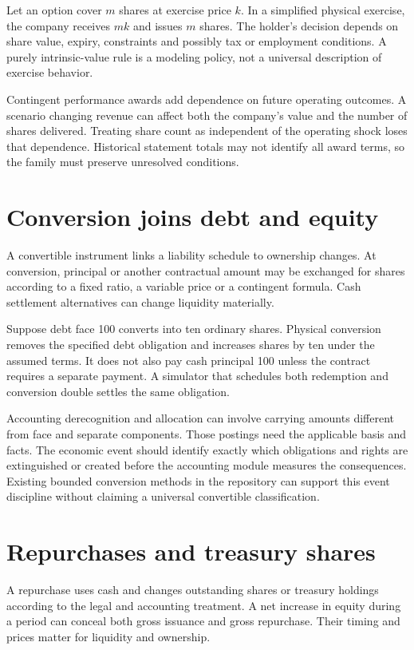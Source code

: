 Let an option cover $m$ shares at exercise price $k$. In a simplified physical exercise, the company receives $mk$ and issues $m$ shares. The holder's decision depends on share value, expiry, constraints and possibly tax or employment conditions. A purely intrinsic-value rule is a modeling policy, not a universal description of exercise behavior.

Contingent performance awards add dependence on future operating outcomes. A scenario changing revenue can affect both the company's value and the number of shares delivered. Treating share count as independent of the operating shock loses that dependence. Historical statement totals may not identify all award terms, so the family must preserve unresolved conditions.

\section{Conversion joins debt and equity}
A convertible instrument links a liability schedule to ownership changes. At conversion, principal or another contractual amount may be exchanged for shares according to a fixed ratio, a variable price or a contingent formula. Cash settlement alternatives can change liquidity materially.

Suppose debt face 100 converts into ten ordinary shares. Physical conversion removes the specified debt obligation and increases shares by ten under the assumed terms. It does not also pay cash principal 100 unless the contract requires a separate payment. A simulator that schedules both redemption and conversion double settles the same obligation.

Accounting derecognition and allocation can involve carrying amounts different from face and separate components. Those postings need the applicable basis and facts. The economic event should identify exactly which obligations and rights are extinguished or created before the accounting module measures the consequences. Existing bounded conversion methods in the repository can support this event discipline without claiming a universal convertible classification.

\section{Repurchases and treasury shares}
A repurchase uses cash and changes outstanding shares or treasury holdings according to the legal and accounting treatment. A net increase in equity during a period can conceal both gross issuance and gross repurchase. Their timing and prices matter for liquidity and ownership.

